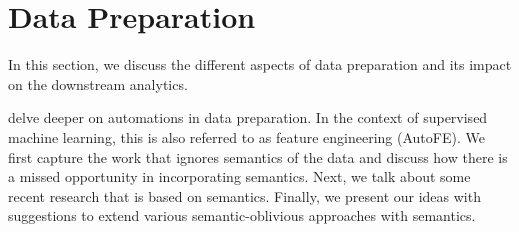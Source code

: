 \documentclass[sigconf]{acmart}
\begin{document}
\section{Data Preparation}
\label{autofe_section}



In this section, we discuss the different aspects of data preparation and its impact on the downstream analytics.


delve deeper on automations in data preparation. In the context of supervised machine learning, this is also referred to as feature engineering (AutoFE). We first capture the work that ignores semantics of the data and discuss how there is a missed opportunity in incorporating semantics. Next, we talk about some recent research that is based on semantics. Finally, we present our ideas with suggestions to extend various semantic-oblivious approaches with semantics.
\end{document}
